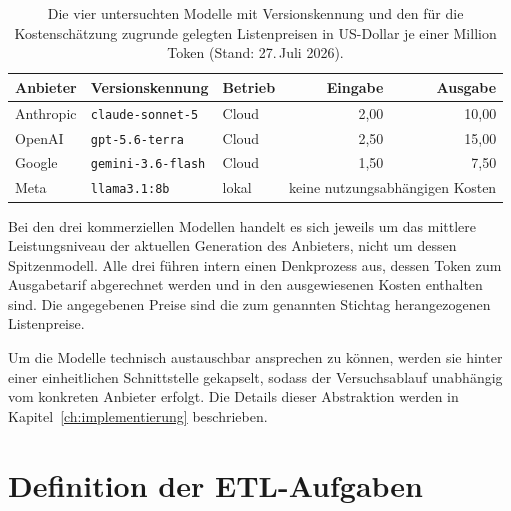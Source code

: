 \begin{table}[htbp]
    \centering
    \small
    \caption[Untersuchte Modelle]{Die vier untersuchten Modelle mit Versionskennung und den für die Kostenschätzung zugrunde gelegten Listenpreisen in US-Dollar je einer Million Token (Stand: 27.\,Juli 2026).}
    \label{tab:modelle}
    \begin{tabularx}{\textwidth}{@{}lXlrr@{}}
        \toprule
        \textbf{Anbieter} & \textbf{Versionskennung} & \textbf{Betrieb} & \textbf{Eingabe} & \textbf{Ausgabe} \\
        \midrule
        Anthropic & \texttt{claude-sonnet-5} & Cloud & 2,00 & 10,00 \\
        OpenAI & \texttt{gpt-5.6-terra} & Cloud & 2,50 & 15,00 \\
        Google & \texttt{gemini-3.6-flash} & Cloud & 1,50 & 7,50 \\
        Meta & \texttt{llama3.1:8b} & lokal & \multicolumn{2}{c}{keine nutzungsabhängigen Kosten} \\
        \bottomrule
    \end{tabularx}
\end{table}

\newpage
Bei den drei kommerziellen Modellen handelt es sich jeweils um das mittlere Leistungsniveau der aktuellen Generation des Anbieters, nicht um dessen Spitzenmodell. Alle drei führen intern einen Denkprozess aus, dessen Token zum Ausgabetarif abgerechnet werden und in den ausgewiesenen Kosten enthalten sind. Die angegebenen Preise sind die zum genannten Stichtag herangezogenen Listenpreise.

Um die Modelle technisch austauschbar ansprechen zu können, werden sie hinter einer einheitlichen Schnittstelle gekapselt, sodass der Versuchsablauf unabhängig vom konkreten Anbieter erfolgt. Die Details dieser Abstraktion werden in Kapitel~\ref{ch:implementierung} beschrieben.

\section{Definition der ETL-Aufgaben}
\label{sec:etl-aufgaben}

